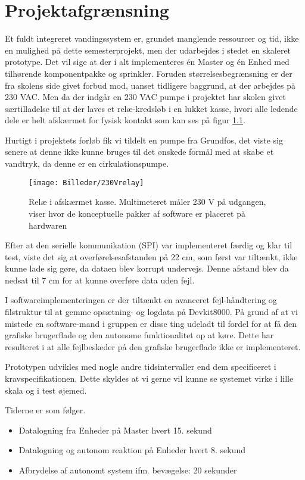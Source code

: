 \chapter{Projektafgrænsning}

Et fuldt integreret vandingssystem er, grundet manglende ressourcer og tid, ikke en mulighed på dette semesterprojekt, men der udarbejdes i stedet en skaleret prototype. Det vil sige at der i alt implementeres én Master og én Enhed med tilhørende komponentpakke og sprinkler. 
Foruden størrelsesbegrænsning er der fra skolens side givet forbud mod, uanset tidligere baggrund, at der arbejdes på 230 VAC. Men da der indgår en 230 VAC pumpe i projektet har skolen givet særtilladelse til at der laves et relæ-kredsløb i en lukket kasse, hvori alle ledende dele er helt afskærmet for fysisk kontakt som kan ses på figur \ref{lab:230Vrelay}.

Hurtigt i projektets forløb fik vi tildelt en pumpe fra Grundfos, det viste sig senere at denne ikke kunne bruges til det ønskede formål med at skabe et vandtryk, da denne er en cirkulationspumpe. 


\begin{figure}[H]
  \centering
    \texttt{[image: Billeder/230Vrelay]}
    \caption{Relæ i afskærmet kasse. Multimeteret måler 230 V på udgangen, viser hvor de konceptuelle pakker af software er placeret på hardwaren}
    \label{lab:230Vrelay}
\end{figure}

Efter at den serielle kommunikation (SPI) var implementeret færdig og klar til test, viste det sig at overførelsesafstanden på 22 cm, som først var tiltænkt, ikke kunne lade sig gøre, da dataen blev korrupt undervejs. Denne afstand blev da nedsat til 7 cm for at kunne overføre data uden fejl.
 
I softwareimplementeringen er der tiltænkt en  avanceret fejl-håndtering og filstruktur til at gemme opsætning- og logdata på Devkit8000. På grund af at vi mistede en software-mand i gruppen er disse ting udeladt til fordel for at få den grafiske brugerflade og den autonome funktionalitet op at køre. Dette har resulteret i at alle fejlbeskeder på den grafiske brugerflade ikke er implementeret.

Prototypen udvikles med nogle andre tidsintervaller end dem specificeret i kravspecifikationen. Dette skyldes at vi gerne vil kunne se systemet virke i lille skala og i test øjemed.

\newpage

Tiderne er som følger.

\begin{itemize}
	\item Datalogning fra Enheder på Master hvert 15. sekund
	\item Datalogning og autonom reaktion på Enheder hvert 8. sekund
	\item Afbrydelse af autonomt system ifm. bevægelse: 20 sekunder
\end{itemize}